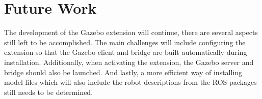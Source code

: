 \section{Future Work}

    The development of the Gazebo extension will continue, there are several aspects still left to be accomplished. The main challenges will include configuring the extension so that the Gazebo client and bridge are built automatically during installation. Additionally, when activating the extension, the Gazebo server and bridge should also be launched. And lastly, a more efficient way of installing model files which will also include the robot descriptions from the ROS packages still needs to be determined.